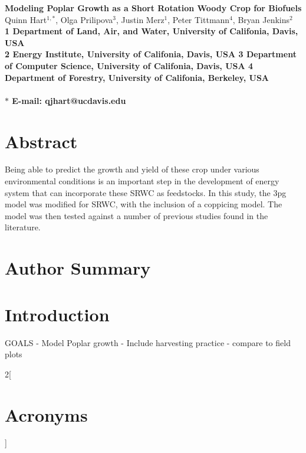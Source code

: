 \documentclass[10pt]{article}
\date{}
\begin{document}
\begin{flushleft}
{\Large
\textbf{Modeling Poplar Growth as a Short Rotation Woody Crop for Biofuels}
}
\\
Quinn Hart$^{1,\ast}$,
Olga Prilipova$^{3}$,
Justin Merz$^{1}$,
Peter Tittmann$^{4}$, 
Bryan Jenkins$^{2}$
\\
\bf{1} Department of Land, Air, and Water, University of Califonia, Davis, USA
\\
\bf{2} Energy Institute, University of Califonia, Davis, USA
\bf{3} Department of Computer Science, University of Califonia, Davis, USA
\bf{4} Department of Forestry, University of Califonia, Berkeley, USA
\\
\\
$\ast$ E-mail: qjhart@ucdavis.edu
\end{flushleft}

\section*{Abstract}

Being able to predict the growth and yield of these crop under various
environmental conditions is an important step in the development of
energy system that can incorporate these \ac{SRWC} as feedstocks.  In
this study, the \acf{3pg} model was modified for \ac{SRWC}, with the
inclusion of a coppicing model.  The model was then tested against a
number of previous studies found in the literature.  

\section*{Author Summary}

\section*{Introduction}


GOALS 
- Model Poplar growth
- Include harvesting practice
- compare to field plots

\begin{multicols}{2}[\section*{Acronyms}]
{\normalsize
\raggedright
\begin{acronym}

\end{acronym}
}
\end{multicols}
\end{document}

